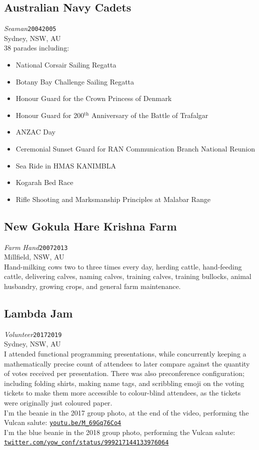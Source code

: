 \documentclass[12pt,a4paper,oneside]{article}
\newcommand{\xp}[6]{{\normalsize\textit{#1}\hfill\texttt{#5}\\\phantom{menace}\hfill#2, #3, #4}\\}
\newcommand{\textapprox}{\raisebox{0.5ex}{\texttildelow}}
\begin{document}
\subsection{Australian Navy Cadets}
\xp{Seaman}{Sydney}{NSW}{AU}{2004\textapprox{}2005}
\\38 parades including:
\begin{itemize}
	\item National Corsair Sailing Regatta
	\item Botany Bay Challenge Sailing Regatta
	\item Honour Guard for the Crown Princess of Denmark
	\item Honour Guard for 200$^\text{th}$ Anniversary of the Battle of Trafalgar
	\item ANZAC Day
	\item Ceremonial Sunset Guard for RAN Communication Branch $\text{National Reunion}$
	\item Sea Ride in HMAS KANIMBLA
	\item Kogarah Bed Race
	\item Rifle Shooting and Marksmanship Principles at Malabar Range
\end{itemize}
\subsection{New Gokula Hare Krishna Farm}
\xp{Farm Hand}{Millfield}{NSW}{AU}{2007\textapprox{}2013}
\\Hand-milking cows two to three times every day, herding cattle, hand-feeding cattle, delivering calves, naming calves, training calves, training bullocks, animal husbandry, growing crops, and general farm maintenance.
\subsection{Lambda Jam}
\xp{Volunteer}{Sydney}{NSW}{AU}{2017\textapprox{}2019}%
\\I attended functional programming presentations, while concurrently keeping a mathematically precise count of attendees to later compare against the quantity of votes received per presentation. There was also preconference configuration; including folding shirts, making name tags, and scribbling emoji on the voting tickets to make them more accessible to colour-blind attendees, as the tickets were originally just coloured paper.
\\I'm the beanie in the 2017 group photo, at the end of the video, performing the Vulcan salute: \href{https://www.youtube.com/watch?v=M_69Gq76Co4}{\texttt{youtu.be/M\_69Gq76Co4}}%
\\I'm the blue beanie in the 2018 group photo, performing the Vulcan salute: \\\href{https://twitter.com/yow_conf/status/999217144133976064}{\texttt{twitter.com/yow\_conf/status/999217144133976064}}
\end{document}
